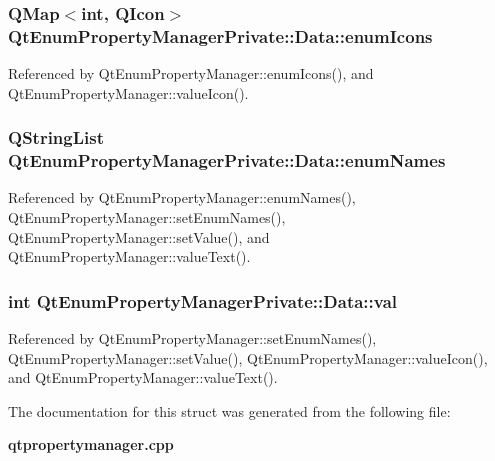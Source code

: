 \subsubsection[{enum\+Icons}]{\setlength{\rightskip}{0pt plus 5cm}Q\+Map$<$int, Q\+Icon$>$ Qt\+Enum\+Property\+Manager\+Private\+::\+Data\+::enum\+Icons}\label{structQtEnumPropertyManagerPrivate_1_1Data_a1115f7d0c859f1464a5305ace5139b3d}


Referenced by Qt\+Enum\+Property\+Manager\+::enum\+Icons(), and Qt\+Enum\+Property\+Manager\+::value\+Icon().

\subsubsection[{enum\+Names}]{\setlength{\rightskip}{0pt plus 5cm}Q\+String\+List Qt\+Enum\+Property\+Manager\+Private\+::\+Data\+::enum\+Names}\label{structQtEnumPropertyManagerPrivate_1_1Data_adfa8135bcae70d8c59803d36e179be63}


Referenced by Qt\+Enum\+Property\+Manager\+::enum\+Names(), Qt\+Enum\+Property\+Manager\+::set\+Enum\+Names(), Qt\+Enum\+Property\+Manager\+::set\+Value(), and Qt\+Enum\+Property\+Manager\+::value\+Text().

\subsubsection[{val}]{\setlength{\rightskip}{0pt plus 5cm}int Qt\+Enum\+Property\+Manager\+Private\+::\+Data\+::val}\label{structQtEnumPropertyManagerPrivate_1_1Data_aac31c340a278a45011d00e8379a64a7f}


Referenced by Qt\+Enum\+Property\+Manager\+::set\+Enum\+Names(), Qt\+Enum\+Property\+Manager\+::set\+Value(), Qt\+Enum\+Property\+Manager\+::value\+Icon(), and Qt\+Enum\+Property\+Manager\+::value\+Text().



The documentation for this struct was generated from the following file\+:\begin{DoxyCompactItemize}
\item 
{\bf qtpropertymanager.\+cpp}\end{DoxyCompactItemize}
